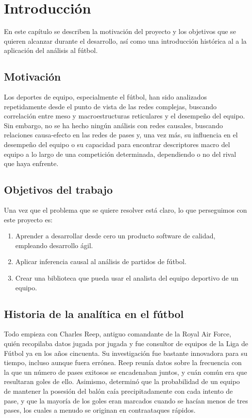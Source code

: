 \chapter{Introducción}

En este capítulo se describen la motivación del proyecto y los objetivos que
se quieren alcanzar durante el desarrollo, así como una introducción histórica al
a la aplicación del análisis al fútbol. 

\section{Motivación}

Los deportes de equipo, especialmente el fútbol, han sido analizados 
repetidamente desde el punto de vista de las redes complejas, buscando 
correlación entre meso y macroestructuras reticulares y el desempeño del 
equipo. Sin embargo, no se ha hecho ningún análisis con redes causales, 
buscando relaciones causa-efecto en las redes de pases y, una vez más, 
su influencia en el desempeño del equipo o su capacidad para encontrar 
descriptores macro del equipo a lo largo de una competición determinada, 
dependiendo o no del rival que haya enfrente.

\section{Objetivos del trabajo} \label{sect:goals}

Una vez que el problema que se quiere resolver está claro, lo que perseguimos
con este proyecto es: 

\begin{enumerate}
    \item \label{obj:1} Aprender a desarrollar desde cero un producto software de calidad, empleando desarrollo ágil.
    \item \label{obj:2} Aplicar inferencia causal al análisis de partidos de fútbol.
    \item \label{obj:3} Crear una biblioteca que pueda usar el analista del equipo deportivo de un equipo.
\end{enumerate}

\section{Historia de la analítica en el fútbol}

Todo empieza con Charles Reep, antiguo comandante de la Royal Air Force, quién
recopilaba datos jugada por jugada y fue consultor de equipos de la Liga de 
Fútbol ya en los años cincuenta. Su investigación fue bastante innovadora para 
su tiempo, incluso aunque fuera errónea. Reep reunía datos sobre la frecuencia 
con la que un número de pases exitosos se encadenaban juntos, y cuán común era 
que resultaran goles de ello. Asimismo, determinó que la probabilidad de un 
equipo de mantener la posesión del balón caía precipitadamente con cada intento 
de pase, y que la mayoría de los goles eran marcados cuando se hacían menos de 
tres pases, los cuales a menudo se originan en contraataques rápidos.

